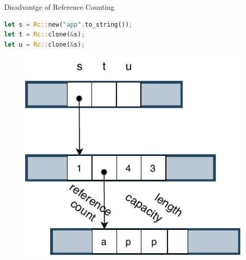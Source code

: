 \documentclass[9pt]{beamer}
\begin{document}

\begin{frame}[fragile]{Disadvantge of Reference Counting}
    
\vspace{-0.5cm}
\begin{minipage}{0.7\linewidth}
\begin{lstlisting}[language=Rust]
let s = Rc::new("app".to_string());
let t = Rc::clone(&s);
let u = Rc::clone(&s); 
\end{lstlisting}
\end{minipage}      

    \begin{minipage}{0.3\linewidth}
        \begin{figure}[hp]
            \centering
            \begin{center}
                    \includegraphics[width=1.0\textwidth]{images/rc1.pdf}
                    \captionsetup{labelformat=empty}
            \end{center}
            

\end{figure}
\end{minipage}
\end{frame}
\end{document}
